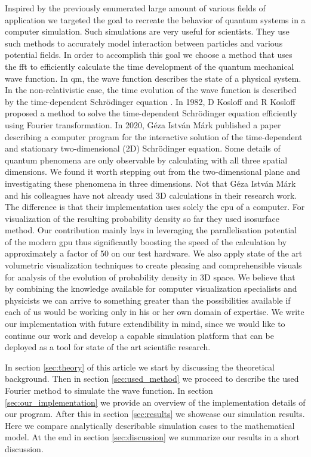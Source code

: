 Inspired by the previously enumerated large amount of various fields of application we targeted the goal to recreate the behavior of quantum systems in a computer simulation.
Such simulations are very useful for scientists. They use such methods to accurately model interaction between particles and various potential fields.
In order to accomplish this goal we choose a method that uses the \acrfull{fft} to efficiently calculate the time development of the quantum mechanical wave function.
In \acrshort{qm}, the wave function describes the state of a physical system. In the non-relativistic case, the time evolution of the wave function is described by the time-dependent Schrödinger equation \cite{schrodinger1926}.
In 1982, D Kosloff and R Kosloff proposed a method \cite{KOSLOFF198335} to solve the time-dependent Schrödinger equation efficiently using Fourier transformation.
In 2020, Géza István Márk published a paper \cite{mark2020webschrodinger} describing a computer program for the interactive solution of the time-dependent and stationary two-dimensional (2D) Schrödinger equation.
Some details of quantum phenomena are only observable by calculating with all three spatial dimensions.
We found it worth stepping out from the two-dimensional plane and investigating these phenomena in three dimensions.
Not that Géza István Márk and his colleagues have not already used 3D calculations in their research work.
The difference is that their implementation uses solely the \acrfull{cpu} of a computer.
For visualization of the resulting probability density so far they used isosurface method.
Our contribution mainly lays in leveraging the parallelisation potential of the modern \acrfull{gpu} thus significantly boosting the speed of the calculation by approximately a factor of 50 on our test hardware.
We also apply state of the art volumetric visualization techniques to create pleasing and comprehensible visuals for analysis of the evolution of probability density in 3D space.
We believe that by combining the knowledge available for computer visualization specialists and physicists we can arrive to something greater than the possibilities available if each of us would be working only in his or her own domain of expertise.
We write our implementation with future extendibility in mind, since we would like to continue our work and develop a capable simulation platform that can be deployed as a tool for state of the art scientific research.

In section \ref{sec:theory} of this article we start by discussing the theoretical background.
Then in section \ref{sec:used_method} we proceed to describe the used Fourier method to simulate the wave function.
In section \ref{sec:our_implementation} we provide an overview of the implementation details of our program.
After this in section \ref{sec:results} we showcase our simulation results.
Here we compare analytically describable simulation cases to the mathematical model.
At the end in section \ref{sec:discussion} we summarize our results in a short discussion.





